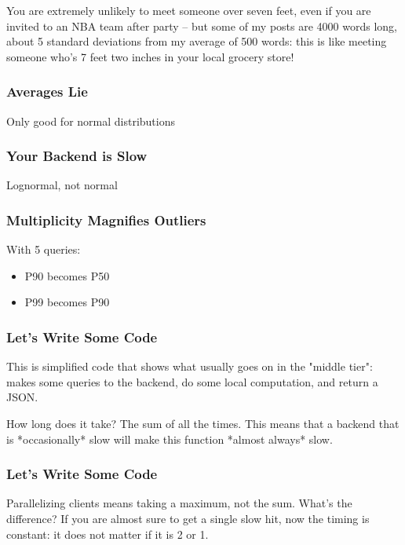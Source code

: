 You are extremely unlikely to meet someone over seven feet,
even if you are invited to an NBA team after party --
but some of my posts are 4000 words long,
about 5 standard deviations from my average of 500 words:
this is like meeting someone who's 7 feet two inches
in your local grocery store!

\begin{frame}
\frametitle{Averages Lie}

Only good for normal distributions

\end{frame}

\begin{frame}
\frametitle{Your Backend is Slow}

Lognormal, not normal

\end{frame}

\begin{frame}
\frametitle{Multiplicity Magnifies Outliers}

With 5 queries:

\begin{itemize}
\item P90 becomes P50
\item P99 becomes P90
\end{itemize}

\end{frame}

\begin{frame}
\frametitle{Let's Write Some Code}



\end{frame}

This is simplified code that shows what usually goes on
in the "middle tier":
makes some queries to the backend,
do some local computation,
and return a JSON.

How long does it take?
The sum of all the times.
This means that a backend that is *occasionally* slow
will make this function *almost always* slow.

\begin{frame}
\frametitle{Let's Write Some Code}



\end{frame}

Parallelizing clients means taking a maximum,
not the sum.
What's the difference?
If you are almost sure to get a single slow hit,
now the timing is constant:
it does not matter if it is 2 or 1.

